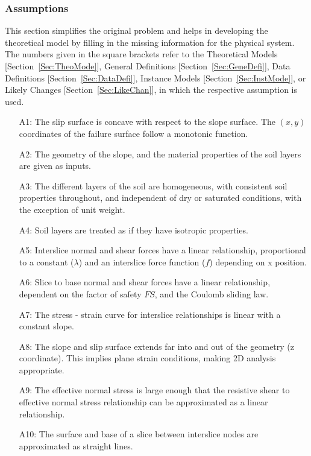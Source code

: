 \documentclass[12pt]{article}
\begin{document}
\subsubsection{Assumptions}
\label{Sec:Assu}
This section simplifies the original problem and helps in developing the theoretical model by filling in the missing information for the physical system. The numbers given in the square brackets refer to the Theoretical Models [Section~\ref{Sec:TheoMode}], General Definitions [Section~\ref{Sec:GeneDefi}], Data Definitions [Section~\ref{Sec:DataDefi}], Instance Models [Section~\ref{Sec:InstMode}], or Likely Changes [Section~\ref{Sec:LikeChan}], in which the respective assumption is used.
\begin{itemize}
\item[A1:]The slip surface is concave with respect to the slope surface. The $(x,y)$ coordinates of the failure surface follow a monotonic function.
\item[A2:]The geometry of the slope, and the material properties of the soil layers are given as inputs.
\item[A3:]The different layers of the soil are homogeneous, with consistent soil properties throughout, and independent of dry or saturated conditions, with the exception of unit weight.
\item[A4:]Soil layers are treated as if they have isotropic properties.
\item[A5:]Interslice normal and shear forces have a linear relationship, proportional to a constant ($\lambda{}$) and an interslice force function ($f$) depending on x position.
\item[A6:]Slice to base normal and shear forces have a linear relationship, dependent on the factor of safety $FS$, and the Coulomb sliding law.
\item[A7:]The stress - strain curve for interslice relationships is linear with a constant slope.
\item[A8:]The slope and slip surface extends far into and out of the geometry (z coordinate). This implies plane strain conditions, making 2D analysis appropriate.
\item[A9:]The effective normal stress is large enough that the resistive shear to effective normal stress relationship can be approximated as a linear relationship.
\item[A10:]The surface and base of a slice between interslice nodes are approximated as straight lines.
\end{itemize}
\end{document}
